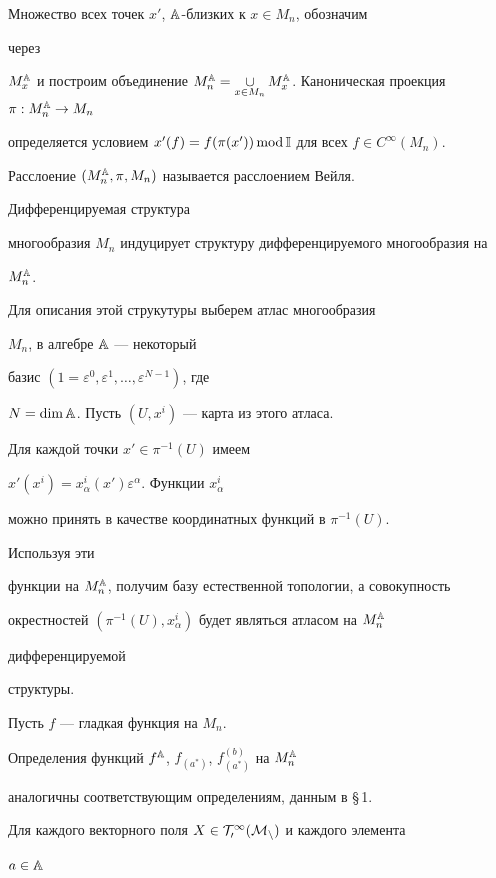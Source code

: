  


Множество всех точек $x'$, $\Bbb A$-близких к $x\in M_n$, обозначим 


через 


$M\A_x$ и построим объединение $M\A_n=\mathop{\cup}\limits_{x\in 


M_n}M\A_x$. Каноническая проекция $\pi:M\A_n\to M_n$ 


определяется условием $x'(f)=f(\pi(x'))\Mod\Bbb I$ для всех $f\in 


C^\infty(M_n)$. 


Расслоение $(M^{\Bbb A}_n,\pi,M_n)$ называется расслоением Вейля. 


Дифференцируемая структура  


многообразия $M_n$ индуцирует структуру дифференцируемого многообразия на 


$M^{\Bbb A}_n$.  


Для описания этой струкутуры выберем атлас многообразия


$M_n$, в алгебре $\Bbb A$ --- некоторый 


базис $(1=\varepsilon^0,\varepsilon^1,\dotsc,\varepsilon^{N-1})$, где 


$N=\dim\Bbb A$. Пусть $(U,x^i)$ --- карта из этого атласа. 


Для каждой точки $x'\in\pi^{-1}(U)$ имеем 


$x'(x^i)=x^i_\alpha(x')\varepsilon^\alpha$. Функции $x^i_\alpha$ 


можно принять в качестве координатных функций в $\pi^{-1}(U)$. 


Используя эти 


функции на $M^{\Bbb A}_n$, получим базу естественной топологии, а совокупность 


окрестностей $(\pi^{-1}(U),x^i_\alpha)$ будет являться атласом на $M^{\Bbb A}_n$ 


дифференцируемой  


структуры. 


 


Пусть $f$ --- гладкая функция на $M_n$.


Определения функций $f^{\Bbb A}$, $f_{(a^*)}$, $f^{(b)}_{(a^*)}$ на $M^{\Bbb A}_n$ 


аналогичны соответствующим определениям, данным в \S\,1. 


 


Для каждого векторного поля $X\in\cal T^1_0(M_n)$ и каждого элемента 


$a\in\Bbb A$ 


